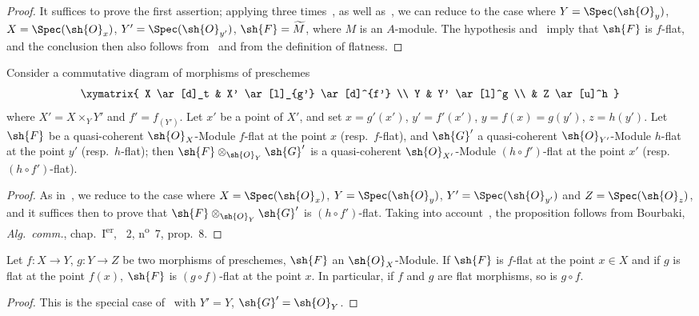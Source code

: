 \begin{proof}
It suffices to prove the first assertion; applying three times~, as well as~, we can reduce to the case where $Y=\Spec(\sh{O}_y)$, $X=\Spec(\sh{O}_x)$, $Y'=\Spec(\sh{O}_{y'})$, $\sh{F}=\widetilde{M}$, where $M$ is an $A$-module.
The hypothesis and~ imply that $\sh{F}$ is $f$-flat, and the conclusion then also follows from~ and from the definition of flatness.
\end{proof}

\begin{proposition}[2.1.5]
\label{IV.2.1.5}
Consider a commutative diagram of morphisms of preschemes
\[
\xymatrix{
  X \ar[d]_t & X' \ar[l]_{g'} \ar[d]^{f'} \\
  Y & Y' \ar[l]^g \\
  & Z \ar[u]^h
}
\]
where $X'=X\times_Y Y'$ and $f'=f_{(Y')}$.
Let $x'$ be a point of $X'$, and set $x=g'(x')$, $y'=f'(x')$, $y=f(x)=g(y')$, $z=h(y')$.
Let $\sh{F}$ be a quasi-coherent $\sh{O}_X$-Module $f$-flat at the point $x$ \textnormal{(}resp.\ $f$-flat\textnormal{)}, and $\sh{G}'$ a quasi-coherent $\sh{O}_{Y'}$-Module $h$-flat at the point $y'$ \textnormal{(}resp.\ $h$-flat\textnormal{)}; then $\sh{F}\otimes_{\sh{O}_Y}\sh{G}'$ is a quasi-coherent $\sh{O}_{X'}$-Module $(h\circ f')$-flat at the point $x'$ \textnormal{(}resp.\ $(h\circ f')$-flat\textnormal{)}.
\end{proposition}

\begin{proof}
As in~, we reduce to the case where $X=\Spec(\sh{O}_x)$, $Y=\Spec(\sh{O}_y)$,
$Y'=\Spec(\sh{O}_{y'})$ and $Z=\Spec(\sh{O}_z)$, and it suffices then to prove that $\sh{F}\otimes_{\sh{O}_Y}\sh{G}'$ is $(h\circ f')$-flat.
Taking into account~, the proposition follows from Bourbaki, \emph{Alg.~comm.}, chap.~I\textsuperscript{er}, \textsection~2, n\textsuperscript{o}~7, prop.~8.
\end{proof}

\begin{corollary}[2.1.6]
\label{IV.2.1.6}
Let $f:X\to Y$, $g:Y\to Z$ be two morphisms of preschemes, $\sh{F}$ an $\sh{O}_X$-Module. If $\sh{F}$ is $f$-flat at the point $x\in X$ and if $g$ is flat at the point $f(x)$, $\sh{F}$ is $(g\circ f)$-flat at the point $x$.
In particular, if $f$ and $g$ are flat morphisms, so is $g\circ f$.
\end{corollary}

\begin{proof}
This is the special case of~ with $Y'=Y$, $\sh{G}'=\sh{O}_Y$.
\end{proof}

